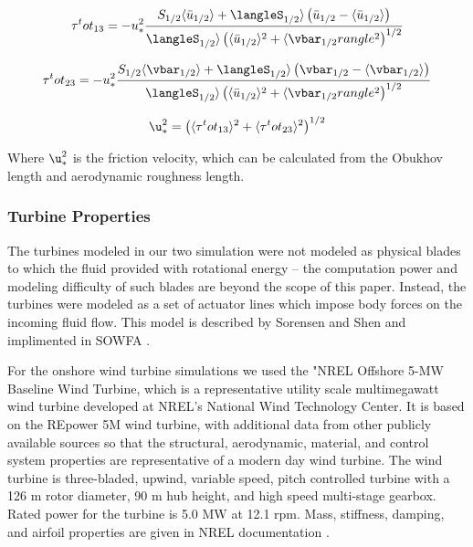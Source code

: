 \begin{equation}
   \label{tau13}
   \tau^tot_{13}=
-u^2_\ast\frac{S_{1/2}\langle \ubar_{1/2}\rangle+\langleS_{1/2}\rangle\left( \ubar_{1/2}-\langle\ubar_{1/2}\rangle\right) }
{\langleS_{1/2}\rangle\left( \langle\ubar_{1/2}\rangle^2+\langle \vbar_{1/2}rangle^2\right)^{1/2} }
\end{equation}

\begin{equation}
   \label{tau23}
   \tau^tot_{23}=
   -u^2_\ast\frac{S_{1/2}\langle \vbar_{1/2}\rangle+\langleS_{1/2}\rangle\left( \vbar_{1/2}-\langle\vbar_{1/2}\rangle\right) }
   {\langleS_{1/2}\rangle\left( \langle\ubar_{1/2}\rangle^2+\langle \vbar_{1/2}rangle^2\right)^{1/2} }
\end{equation}

\begin{equation}
   \label{friction velocity}
   \u^2_\ast=\left( \langle\tau^tot_{13}\rangle^2+\langle \tau^tot_{23}\rangle^2\right)^{1/2}  
\end{equation}

Where $\u^2_\ast$ is the friction velocity, which can be calculated from the Obukhov length and aerodynamic roughness length.

\subsubsection{Turbine Properties}

The turbines modeled in our two simulation were not modeled as physical blades to which the fluid provided with rotational energy -- the computation power and modeling difficulty of such blades are beyond the scope of this paper. Instead, the turbines were modeled as a set of actuator lines which impose body forces on the incoming fluid flow. This model is described by Sorensen and Shen \cite{sorensen:393} and implimented in SOWFA \cite{SOWFA}.

For the onshore wind turbine simulations we used the "NREL Offshore 5-MW Baseline Wind Turbine\cite{jonkman_definition_2009}, which is a representative utility scale multimegawatt wind turbine developed at NREL's National Wind Technology Center.  It is based on the REpower 5M wind turbine, with additional data from other publicly available sources so that the structural, aerodynamic, material, and control system properties are representative of a modern day wind turbine.  The wind turbine is three-bladed, upwind, variable speed, pitch controlled turbine with a 126 m rotor diameter, 90 m hub height, and high speed multi-stage gearbox.  Rated power for the turbine is 5.0 MW at 12.1 rpm.  Mass, stiffness, damping, and airfoil properties are given in NREL documentation \cite{jonkman_definition_2009}.

